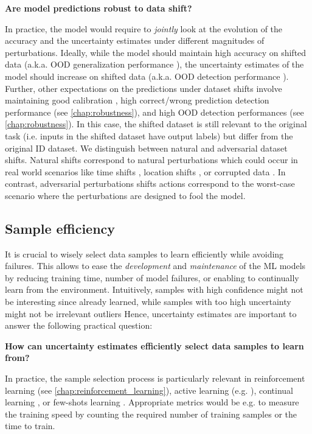 \begin{center}
    \textbf{Are model predictions robust to data shift?}
\end{center}

In practice, the model would require to \emph{jointly} look at the evolution of the accuracy and the uncertainty estimates under different magnitudes of perturbations. Ideally, while the model should maintain high accuracy on shifted data (a.k.a. OOD generalization performance \cite{ood-generalization-survey}), the uncertainty estimates of the model should increase on shifted data (a.k.a. OOD detection performance \cite{ood-detection-survey}). Further, other expectations on the predictions under dataset shifts involve maintaining good calibration \cite{dataset-shift}, high correct/wrong prediction detection performance (see \cref{chap:robustness}), and high OOD detection performances (see \cref{chap:robustness}). In this case, the shifted dataset is still relevant to the original task (i.e. inputs in the shifted dataset have output labels) but differ from the original ID dataset. We distinguish between natural and adversarial dataset shifts. Natural shifts correspond to natural perturbations which could occur in real world scenarios like time shifts \cite{wilds, neuhold201mapillary, shifts-dataset}, location shifts \cite{wilds, neuhold201mapillary, shifts-dataset}, or corrupted data \cite{benchmarking-corruptions, taori2020shift}. In contrast, adversarial perturbations shifts actions correspond to the worst-case scenario where the perturbations are designed to fool the model.

\subsection{Sample efficiency}

It is crucial to wisely select data samples to learn efficiently while avoiding failures. This allows to ease the \emph{development} and \emph{maintenance} of the ML models by reducing training time, number of model failures, or enabling to continually learn from the environment. Intuitively, samples with high confidence might not be interesting since already learned, while samples with too high uncertainty might not be irrelevant outliers Hence, uncertainty estimates are important to answer the following practical question:

\begin{center}
    \textbf{How can uncertainty estimates efficiently select data samples to learn from?}
\end{center}

In practice, the sample selection process is particularly relevant in reinforcement learning (see \cref{chap:reinforcement_learning}), active learning (e.g. \cite{gal2017bald, kirsch2019batch}), continual learning \cite{hsu2018continual, lin2021clear}, or few-shots learning \cite{antoniou2020fewshots}. Appropriate metrics would be e.g. to measure the training speed by counting the required number of training samples or the time to train.
